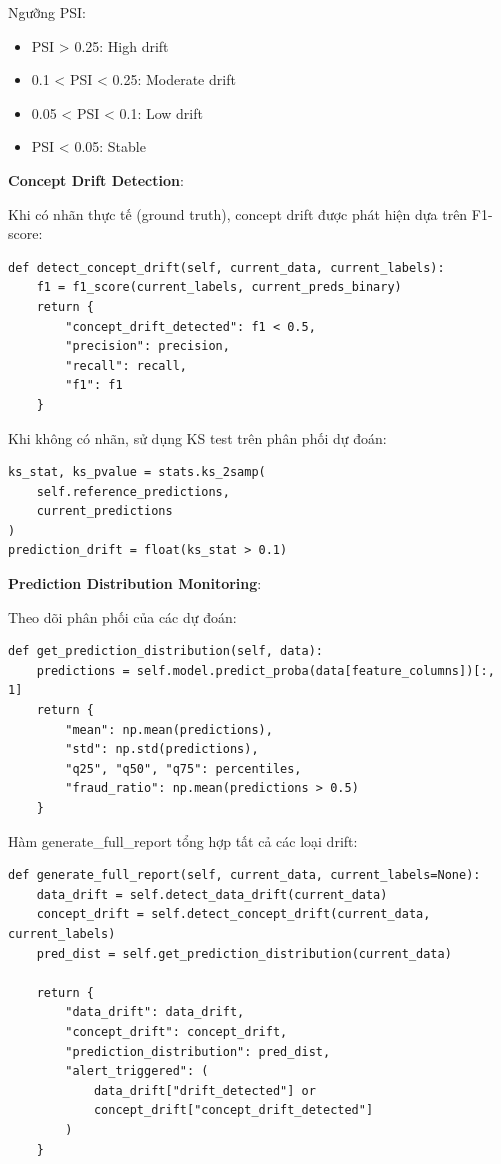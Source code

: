 Ngưỡng PSI:
\begin{itemize}
    \item PSI > 0.25: High drift
    \item 0.1 < PSI < 0.25: Moderate drift
    \item 0.05 < PSI < 0.1: Low drift
    \item PSI < 0.05: Stable
\end{itemize}

\textbf{Concept Drift Detection}:

Khi có nhãn thực tế (ground truth), concept drift được phát hiện dựa trên F1-score:

\begin{verbatim}
def detect_concept_drift(self, current_data, current_labels):
    f1 = f1_score(current_labels, current_preds_binary)
    return {
        "concept_drift_detected": f1 < 0.5,
        "precision": precision,
        "recall": recall,
        "f1": f1
    }
\end{verbatim}

Khi không có nhãn, sử dụng KS test trên phân phối dự đoán:

\begin{verbatim}
ks_stat, ks_pvalue = stats.ks_2samp(
    self.reference_predictions,
    current_predictions
)
prediction_drift = float(ks_stat > 0.1)
\end{verbatim}

\textbf{Prediction Distribution Monitoring}:

Theo dõi phân phối của các dự đoán:

\begin{verbatim}
def get_prediction_distribution(self, data):
    predictions = self.model.predict_proba(data[feature_columns])[:, 1]
    return {
        "mean": np.mean(predictions),
        "std": np.std(predictions),
        "q25", "q50", "q75": percentiles,
        "fraud_ratio": np.mean(predictions > 0.5)
    }
\end{verbatim}

Hàm generate\_full\_report tổng hợp tất cả các loại drift:

\begin{verbatim}
def generate_full_report(self, current_data, current_labels=None):
    data_drift = self.detect_data_drift(current_data)
    concept_drift = self.detect_concept_drift(current_data, current_labels)
    pred_dist = self.get_prediction_distribution(current_data)
    
    return {
        "data_drift": data_drift,
        "concept_drift": concept_drift,
        "prediction_distribution": pred_dist,
        "alert_triggered": (
            data_drift["drift_detected"] or
            concept_drift["concept_drift_detected"]
        )
    }
\end{verbatim}

